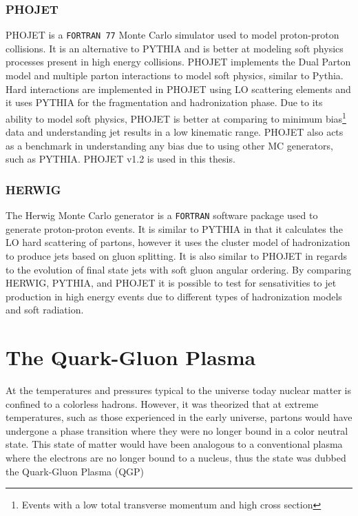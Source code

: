 \subsubsection{PHOJET}
PHOJET is a \verb|FORTRAN 77| Monte Carlo simulator used to model proton-proton collisions. It is an alternative to PYTHIA and is better at modeling soft physics processes present in high energy collisions.   PHOJET implements the Dual Parton model\cite{CAPELLA1994225}\cite{Wong:241251} and multiple parton interactions\cite{Bopp:1998rc} to model soft physics, similar to Pythia.  Hard interactions are implemented in PHOJET using LO scattering elements and it uses PYTHIA for the fragmentation and hadronization phase.  Due to its ability to model soft physics, PHOJET is better at comparing to minimum bias\footnote{Events with a low total transverse momentum and high cross section} data and understanding jet results in a low kinematic range.  PHOJET also acts as a benchmark in understanding any bias due to using other MC generators, such as PYTHIA.  PHOJET v1.2 is used in this thesis.


\subsubsection{HERWIG}
The Herwig\cite{Bahr:2008pv} Monte Carlo generator is a \verb|FORTRAN| software package used to generate proton-proton events.  It is similar to PYTHIA in that it calculates the LO hard scattering of partons, however it uses the cluster model of hadronization to produce jets based on gluon splitting.  It is also similar to PHOJET in regards to the evolution of final state jets with soft gluon angular ordering.  By comparing HERWIG, PYTHIA, and PHOJET it is possible to test for sensativities to jet production in high energy events due to different types of hadronization models and soft radiation.


\section{The Quark-Gluon Plasma}
At the temperatures and pressures typical to the universe today nuclear matter is confined to a colorless hadrons.  However, it was theorized that at extreme temperatures, such as those experienced in the early universe, partons would have undergone a phase transition where they were no longer bound in a color neutral state.  This state of matter would have been analogous to a conventional plasma where the electrons are no longer bound to a nucleus, thus the state was dubbed the Quark-Gluon Plasma (QGP)

